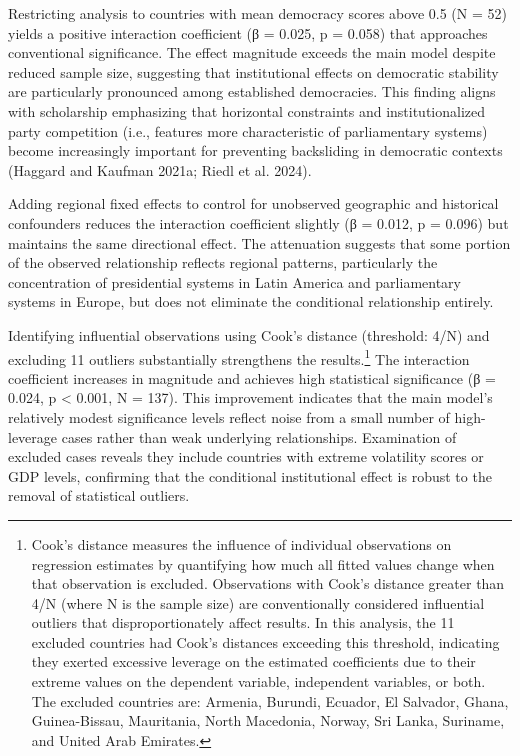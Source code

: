 \documentclass[
  letterpaper,
  DIV=11,
  numbers=noendperiod]{scrartcl}
\begin{document}
Restricting analysis to countries with mean democracy scores above 0.5
(N = 52) yields a positive interaction coefficient (β = 0.025, p =
0.058) that approaches conventional significance. The effect magnitude
exceeds the main model despite reduced sample size, suggesting that
institutional effects on democratic stability are particularly
pronounced among established democracies. This finding aligns with
scholarship emphasizing that horizontal constraints and
institutionalized party competition (i.e., features more characteristic
of parliamentary systems) become increasingly important for preventing
backsliding in democratic contexts (Haggard and Kaufman 2021a; Riedl et
al. 2024).

Adding regional fixed effects to control for unobserved geographic and
historical confounders reduces the interaction coefficient slightly (β =
0.012, p = 0.096) but maintains the same directional effect. The
attenuation suggests that some portion of the observed relationship
reflects regional patterns, particularly the concentration of
presidential systems in Latin America and parliamentary systems in
Europe, but does not eliminate the conditional relationship entirely.

Identifying influential observations using Cook's distance (threshold:
4/N) and excluding 11 outliers substantially strengthens the
results.\footnote{Cook's distance measures the influence of individual
  observations on regression estimates by quantifying how much all
  fitted values change when that observation is excluded. Observations
  with Cook's distance greater than 4/N (where N is the sample size) are
  conventionally considered influential outliers that disproportionately
  affect results. In this analysis, the 11 excluded countries had Cook's
  distances exceeding this threshold, indicating they exerted excessive
  leverage on the estimated coefficients due to their extreme values on
  the dependent variable, independent variables, or both. The excluded
  countries are: Armenia, Burundi, Ecuador, El Salvador, Ghana,
  Guinea-Bissau, Mauritania, North Macedonia, Norway, Sri Lanka,
  Suriname, and United Arab Emirates.} The interaction coefficient
increases in magnitude and achieves high statistical significance (β =
0.024, p \textless{} 0.001, N = 137). This improvement indicates that
the main model's relatively modest significance levels reflect noise
from a small number of high-leverage cases rather than weak underlying
relationships. Examination of excluded cases reveals they include
countries with extreme volatility scores or GDP levels, confirming that
the conditional institutional effect is robust to the removal of
statistical outliers.
\end{document}
